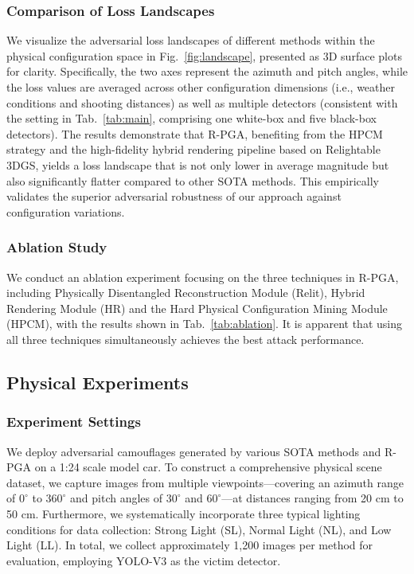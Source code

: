 \documentclass[10pt,journal,compsoc]{IEEEtran}
\begin{document}
\subsubsection{Comparison of Loss Landscapes}

We visualize the adversarial loss landscapes of different methods within the physical configuration space in Fig.~\ref{fig:landscape}, presented as 3D surface plots for clarity. 
Specifically, the two axes represent the azimuth and pitch angles, while the loss values are averaged across other configuration dimensions (i.e., weather conditions and shooting distances) as well as multiple detectors (consistent with the setting in Tab.~\ref{tab:main}, comprising one white-box and five black-box detectors). 
The results demonstrate that R-PGA, benefiting from the HPCM strategy and the high-fidelity hybrid rendering pipeline based on Relightable 3DGS, yields a loss landscape that is not only lower in average magnitude but also significantly flatter compared to other SOTA methods.
This empirically validates the superior adversarial robustness of our approach against configuration variations.


\subsubsection{Ablation Study}
We conduct an ablation experiment focusing on the three techniques in R-PGA, including Physically Disentangled Reconstruction Module (Relit), Hybrid Rendering Module (HR) and the Hard Physical Configuration Mining Module (HPCM), with the results shown in Tab.~\ref{tab:ablation}. It is apparent that using all three techniques simultaneously achieves the best attack performance.

\subsection{Physical Experiments}



\subsubsection{Experiment Settings}
\label{sec:physet}
We deploy adversarial camouflages generated by various SOTA methods and R-PGA on a 1:24 scale model car. To construct a comprehensive physical scene dataset, we capture images from multiple viewpoints—covering an azimuth range of $0^{\circ}$ to $360^{\circ}$ and pitch angles of $30^{\circ}$ and $60^{\circ}$—at distances ranging from 20 cm to 50 cm. Furthermore, we systematically incorporate three typical lighting conditions for data collection: Strong Light (SL), Normal Light (NL), and Low Light (LL). In total, we collect approximately 1,200 images per method for evaluation, employing YOLO-V3 as the victim detector.
\end{document}
